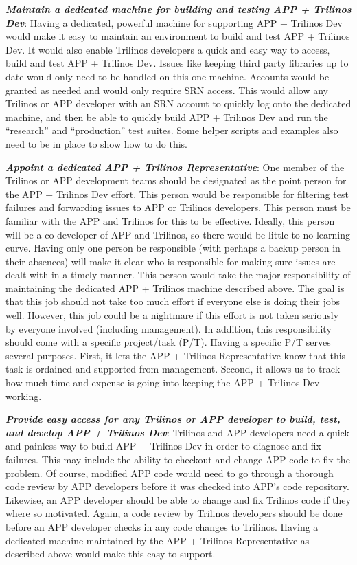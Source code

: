 \documentclass[pdf,ps2pdf,11pt]{SANDreport}
\begin{document}
{}\textit{\textbf{Maintain a dedicated machine for building and testing APP +
Trilinos Dev}}: Having a dedicated, powerful machine for supporting APP +
Trilinos Dev would make it easy to maintain an environment to build and test
APP + Trilinos Dev.  It would also enable Trilinos developers a quick and easy
way to access, build and test APP + Trilinos Dev.  Issues like keeping third
party libraries up to date would only need to be handled on this one machine.
Accounts would be granted as needed and would only require SRN access.  This
would allow any Trilinos or APP developer with an SRN account to quickly log
onto the dedicated machine, and then be able to quickly build APP + Trilinos
Dev and run the ``research'' and ``production'' test suites.  Some helper
scripts and examples also need to be in place to show how to do this.

{}\textit{\textbf{Appoint a dedicated APP + Trilinos Representative}}: One
member of the Trilinos or APP development teams should be designated as the
point person for the APP + Trilinos Dev effort.  This person would be
responsible for filtering test failures and forwarding issues to APP or
Trilinos developers.  This person must be familiar with the APP and Trilinos
for this to be effective.  Ideally, this person will be a co-developer of APP
and Trilinos, so there would be little-to-no learning curve.  Having only one
person be responsible (with perhaps a backup person in their absences) will
make it clear who is responsible for making sure issues are dealt with in a
timely manner.  This person would take the major responsibility of maintaining
the dedicated APP + Trilinos machine described above. The goal is that this
job should not take too much effort if everyone else is doing their jobs well.
However, this job could be a nightmare if this effort is not taken seriously
by everyone involved (including management).  In addition, this responsibility
should come with a specific project/task (P/T).  Having a specific P/T serves
several purposes.  First, it lets the APP + Trilinos Representative know that
this task is ordained and supported from management.  Second, it allows us to
track how much time and expense is going into keeping the APP + Trilinos Dev
working.

{}\textit{\textbf{Provide easy access for any Trilinos or APP developer to
build, test, and develop APP + Trilinos Dev}}: Trilinos and APP developers
need a quick and painless way to build APP + Trilinos Dev in order to diagnose
and fix failures.  This may include the ability to checkout and change APP
code to fix the problem.  Of course, modified APP code would need to go
through a thorough code review by APP developers before it was checked into
APP's code repository.  Likewise, an APP developer should be able to change
and fix Trilinos code if they where so motivated.  Again, a code review by
Trilinos developers should be done before an APP developer checks in any code
changes to Trilinos.  Having a dedicated machine maintained by the APP +
Trilinos Representative as described above would make this easy to support.
\end{document}
